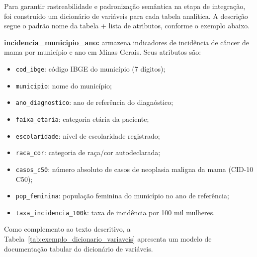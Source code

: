Para garantir rastreabilidade e padronização semântica na etapa de integração, foi construído um dicionário de variáveis para cada tabela analítica. A descrição segue o padrão nome da tabela + lista de atributos, conforme o exemplo abaixo.

\textbf{incidencia\_municipio\_ano:} armazena indicadores de incidência de câncer de mama por município e ano em Minas Gerais. Seus atributos são:

\begin{itemize}
    \item \texttt{cod\_ibge}: código IBGE do município (7 dígitos);
    \item \texttt{municipio}: nome do município;
    \item \texttt{ano\_diagnostico}: ano de referência do diagnóstico;
    \item \texttt{faixa\_etaria}: categoria etária da paciente;
    \item \texttt{escolaridade}: nível de escolaridade registrado;
    \item \texttt{raca\_cor}: categoria de raça/cor autodeclarada;
    \item \texttt{casos\_c50}: número absoluto de casos de neoplasia maligna da mama (CID-10 C50);
    \item \texttt{pop\_feminina}: população feminina do município no ano de referência;
    \item \texttt{taxa\_incidencia\_100k}: taxa de incidência por 100 mil mulheres.
\end{itemize}

Como complemento ao texto descritivo, a Tabela~\ref{tab:exemplo_dicionario_variaveis} apresenta um modelo de documentação tabular do dicionário de variáveis.

